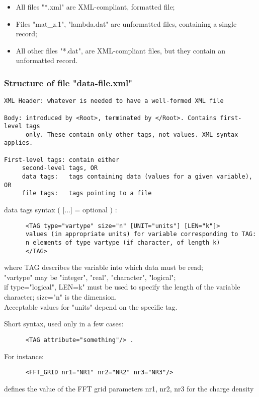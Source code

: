 \documentclass[12pt,a4paper]{article}
\begin{document}
\begin{itemize}
\item All files "*.xml" are XML-compliant, formatted file;
\item Files "mat\_z.1", "lambda.dat" are unformatted files, containing a single record;
\item All other files "*.dat", are XML-compliant files, but they
  contain an unformatted record.
\end{itemize}

\subsubsection{Structure of file "data-file.xml"}

\begin{verbatim}
XML Header: whatever is needed to have a well-formed XML file

Body: introduced by <Root>, terminated by </Root>. Contains first-level tags
      only. These contain only other tags, not values. XML syntax applies.

First-level tags: contain either
     second-level tags, OR
     data tags:   tags containing data (values for a given variable), OR
     file tags:   tags pointing to a file
\end{verbatim}
data tags syntax ( [...] = optional ) :
\begin{verbatim}
      <TAG type="vartype" size="n" [UNIT="units"] [LEN="k"]>
      values (in appropriate units) for variable corresponding to TAG:
      n elements of type vartype (if character, of length k)
      </TAG>
\end{verbatim}
where TAG describes the variable into which data must be read;\\
"vartype" may be "integer", "real", "character", "logical";\\
if type="logical", LEN=k" must be used to specify the length
of the variable character; size="n" is the dimension.\\
Acceptable values for "units" depend on the specific tag.

Short syntax, used only in a few cases:
\begin{verbatim}
      <TAG attribute="something"/> .
\end{verbatim}
For instance:
\begin{verbatim}
      <FFT_GRID nr1="NR1" nr2="NR2" nr3="NR3"/>
\end{verbatim}
defines the value of the FFT grid parameters nr1, nr2, nr3
for the charge density
\end{document}
